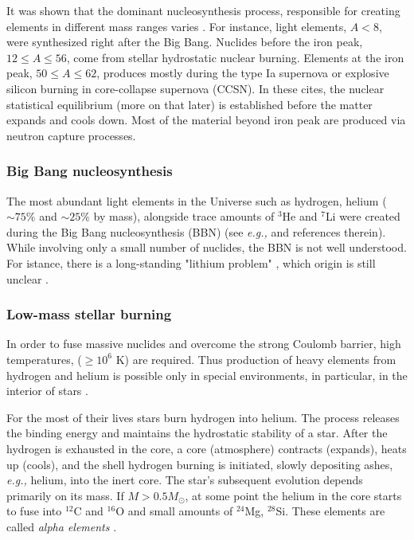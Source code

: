 \documentclass[11pt,a4paper,headinclude=true,DIV=14,BCOR=8mm,chapterprefix,listof=totoc,twoside,openright,abstracton]{scrbook}
\begin{document}
It was shown that the dominant nucleosynthesis process, responsible for creating elements in different mass ranges varies \cite{Burbidge:1957}. 
For instance, light elements, $A<8$, were synthesized right after the Big Bang. Nuclides before the iron peak, $12\leq A\leq 56$, come from stellar hydrostatic nuclear burning. Elements at the iron peak, $50\leq A \leq 62$, produces mostly during the type Ia supernova or explosive silicon burning in core-collapse supernova (CCSN). In these cites, the nuclear statistical equilibrium (more on that later) is established before the matter expands and cools down. 
Most of the material beyond iron peak are produced via neutron capture processes.


\subsubsection{Big Bang nucleosynthesis}

The most abundant light elements in the Universe such as hydrogen, helium ($\sim 75\%$ and $\sim 25\%$ by mass), alongside trace amounts of $^{3}$He and $^{7}$Li were created during the Big Bang nucleosynthesis (BBN) (see \textit{e.g.,} \cite{Tytler:2000qf} and references therein). While involving only a small number of nuclides, the BBN is not well understood. For istance, there is a long-standing "lithium problem" \cite{Coc:2013eha}, which origin is still unclear   \cite{Fields:2011zzb}.


\subsubsection{Low-mass stellar burning}

In order to fuse massive nuclides and overcome the strong Coulomb barrier, high temperatures, ($\geq 10^6$ K) are required. Thus production of heavy elements from hydrogen and helium is possible only in special environments, in particular, in the interior of stars \cite{Bethe:1939}. 

For the most of their lives stars burn hydrogen into helium. The process releases the binding energy and maintains the hydrostatic stability of a star. After the hydrogen is exhausted in the core, a core (atmosphere) contracts (expands), heats up (cools), and the shell hydrogen burning is initiated, slowly depositing ashes, \textit{e.g.,} helium, into the inert core. 
The star's subsequent evolution depends primarily on its mass. If $M>0.5M_{\odot}$, at some point the helium in the core starts to fuse into $^{12}$C and $^{16}$O and small amounts of $^{24}$Mg, $^{28}$Si. These elements are called \textit{alpha elements}  \cite{Rolfs:1988,Hasen:2004}. 
\end{document}
